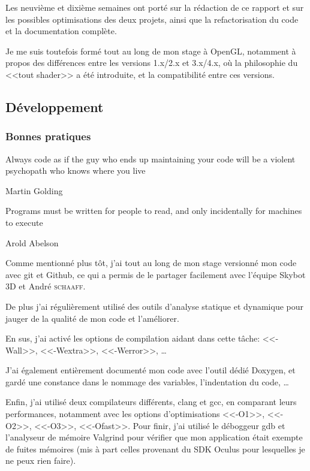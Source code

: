 \documentclass[a4paper,french,12pt]{article}
\begin{document}
		Les neuvième et dixième semaines ont porté sur la rédaction de ce rapport et sur les possibles optimisations
		des deux projets, ainsi que la refactorisation du code et la documentation complète.
				
		Je me suis toutefois formé tout au long de mon stage à OpenGL, notamment à propos
		des différences entre les versions 1.x/2.x et 3.x/4.x, où la philosophie du <<tout shader>> a été introduite,
		et la compatibilité entre ces versions.
		
		
	
	\subsection{Développement}
	
	  \subsubsection{Bonnes pratiques}
	    \epigraph{Always code as if the guy who ends up maintaining your code will be a violent psychopath who knows where you live}{Martin Golding}
	    \epigraph{Programs must be written for people to read, and only incidentally for machines to execute}{Arold Abelson}
	    
	    Comme mentionné plus tôt, j'ai tout au long de mon stage versionné mon code avec git et Github, ce qui a
	    permis de le partager facilement avec l'équipe Skybot 3D et André \textsc{schaaff}.
	    
	    De plus j'ai régulièrement utilisé des outils d'analyse statique et dynamique pour jauger de la qualité de
	    mon code et l'améliorer.
	    
	    En sus, j'ai activé les options de compilation aidant dans cette tâche: <<-Wall>>, <<-Wextra>>, <<-Werror>>, \ldots
	    
	    
	    
	    J'ai également entièrement documenté mon code avec l'outil dédié Doxygen, et gardé une constance dans le nommage des variables,
	    l'indentation du code, \ldots
	    
	    Enfin, j'ai utilisé deux compilateurs différents, clang et gcc, en comparant leurs performances,
	    notamment avec les options d'optimisations <<-O1>>, <<-O2>>, <<-O3>>, <<-Ofast>>.
	    Pour finir, j'ai utilisé le déboggeur gdb et l'analyseur de mémoire Valgrind pour vérifier que mon application
	    était exempte de fuites mémoires (mis à part celles provenant du SDK Oculus pour lesquelles je ne peux rien faire).
	    
\end{document}
